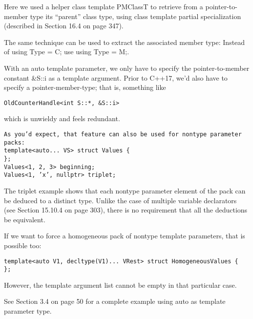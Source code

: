 Here we used a helper class template PMClassT to retrieve from a pointer-to-member type its “parent” class type, using class template partial specialization (described in Section 16.4 on page 347).

\begin{tcolorbox}[colback=webgreen!5!white,colframe=webgreen!75!black]
\hspace*{0.75cm}The same technique can be used to extract the associated member type: Instead of using Type = C; use using Type = M;.
\end{tcolorbox}

With an auto template parameter, we only have to specify the pointer-to-member constant \&S::i as a template argument. Prior to C++17, we’d also have to specify a pointer-member-type; that is, something like

\begin{lstlisting}[style=styleCXX]
OldCounterHandle<int S::*, &S::i>
\end{lstlisting}

which is unwieldy and feels redundant.

\begin{lstlisting}[style=styleCXX]
As you’d expect, that feature can also be used for nontype parameter packs:
template<auto... VS> struct Values {
};
Values<1, 2, 3> beginning;
Values<1, ’x’, nullptr> triplet;
\end{lstlisting}

The triplet example shows that each nontype parameter element of the pack can be deduced to a distinct type. Unlike the case of multiple variable declarators (see Section 15.10.4 on page 303), there is no requirement that all the deductions be equivalent.

If we want to force a homogeneous pack of nontype template parameters, that is possible too:

\begin{lstlisting}[style=styleCXX]
template<auto V1, decltype(V1)... VRest> struct HomogeneousValues {
};
\end{lstlisting}

However, the template argument list cannot be empty in that particular case.

See Section 3.4 on page 50 for a complete example using auto as template parameter type.


